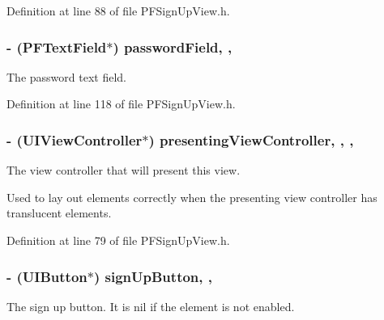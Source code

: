 Definition at line 88 of file P\+F\+Sign\+Up\+View.\+h.

\hypertarget{interface_p_f_sign_up_view_a626e890c1c1039321b71dc774fc080bc}{}
\subsubsection[{password\+Field}]{\setlength{\rightskip}{0pt plus 5cm}-\/ ({\bf P\+F\+Text\+Field}$\ast$) password\+Field\hspace{0.3cm}{\ttfamily [read]}, {\ttfamily [nonatomic]}, {\ttfamily [strong]}}\label{interface_p_f_sign_up_view_a626e890c1c1039321b71dc774fc080bc}
The password text field. 

Definition at line 118 of file P\+F\+Sign\+Up\+View.\+h.

\hypertarget{interface_p_f_sign_up_view_a48e4f5a10409de79d5a3e3bc18de0213}{}
\subsubsection[{presenting\+View\+Controller}]{\setlength{\rightskip}{0pt plus 5cm}-\/ (U\+I\+View\+Controller$\ast$) presenting\+View\+Controller\hspace{0.3cm}{\ttfamily [read]}, {\ttfamily [write]}, {\ttfamily [nonatomic]}, {\ttfamily [weak]}}\label{interface_p_f_sign_up_view_a48e4f5a10409de79d5a3e3bc18de0213}
The view controller that will present this view.

Used to lay out elements correctly when the presenting view controller has translucent elements. 

Definition at line 79 of file P\+F\+Sign\+Up\+View.\+h.

\hypertarget{interface_p_f_sign_up_view_ae319a64a63e1cc268b3a09263783b6f7}{}
\subsubsection[{sign\+Up\+Button}]{\setlength{\rightskip}{0pt plus 5cm}-\/ (U\+I\+Button$\ast$) sign\+Up\+Button\hspace{0.3cm}{\ttfamily [read]}, {\ttfamily [nonatomic]}, {\ttfamily [strong]}}\label{interface_p_f_sign_up_view_ae319a64a63e1cc268b3a09263783b6f7}
The sign up button. It is {\ttfamily nil} if the element is not enabled. 

